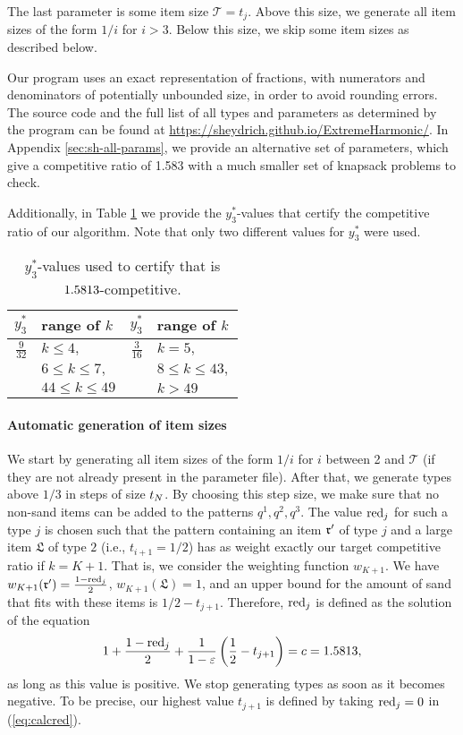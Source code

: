 The last parameter is some item size $\mathcal{T}=t_j$.
Above this size, 
we generate all item sizes of the form $1/i$ for $i>3$. 
Below this size, we skip some item sizes as described below.


Our program uses an exact representation of fractions, with numerators and denominators of potentially unbounded size, in order to avoid rounding errors. 
The source code and the full list of all types and parameters as determined by the program can be found at  \url{https://sheydrich.github.io/ExtremeHarmonic/}. 
In Appendix \ref{sec:sh-all-params}, we provide an alternative set of parameters, which give a competitive ratio of 1.583 with a much smaller set of knapsack problems to check.

Additionally, in Table \ref{tab:sonofharm-y3} we provide the $y_3^*$-values that certify the competitive ratio of our algorithm. Note that only two different values for $y_3^*$ were used.

\begin{table}[h]
	\caption{$y_3^*$-values used to certify that \SonofH{} is $1.5813$-competitive.}
	\label{tab:sonofharm-y3}
	\centering
		\begin{tabular}{|r|l||r|l|}\hline
			$y_3^*$ & range of $k$ & $y_3^*$ & range of $k$ \\\hline
			$\frac{9}{32}$ & $k\le 4,$ & $\frac{3}{16}$ & $k=5,$\\
			& $6\le k \le 7, $ && $8 \le k \le 43, $\\
			& $44\le k\le 49$ && $k > 49$\\\hline
\end{tabular}
\end{table}




\paragraph{Automatic generation of item sizes}\label{sec:automatic-size-generation}
We start by generating all item sizes of the form $1/i$ for $i$ between 2 and $\mathcal{T}$ (if they are not already present in the parameter file). After that, we generate types above $1/3$ in steps of size $t_N$. By choosing this step size, we make sure that no non-sand items can be added to the patterns $q^1, q^2, q^3$. 
The value $\mathrm{red}_j$ for such a type $j$ is chosen such that the pattern containing an item $\mathfrak{r}'$ of type $j$ and a large item $\mathfrak{L}$ of type $2$ (i.e., $t_{i+1}=1/2$) has as weight exactly our target competitive ratio if $k=K+1$.
That is, we consider the weighting function $w_{K+1}$. We have $w_{K+1}(\mathfrak{r}') = \frac{1-\mathrm{red}_j}{2}$, $w_{K+1}(\mathfrak{L}) = 1$, and an upper bound for the amount of sand that fits with these items is 
$1/2-t_{j+1}$. Therefore, $\mathrm{red}_j$ is defined as the solution of the equation
\begin{equation}
\label{eq:calcred}
1 + \frac{1-\mathrm{red}_j}{2} +\frac{1}{1-\varepsilon}\left(\frac12 - t_{j+1}\right) = c = 1.5813,
\end{equation}
as long as this value is positive. We stop generating types as soon as it becomes negative.
To be precise, our highest value $t_{j+1}$ is defined by taking $\mathrm{red}_j=0$ in (\ref{eq:calcred}).

